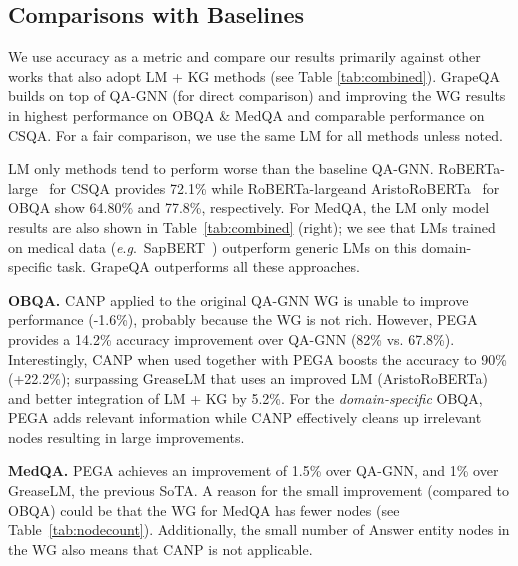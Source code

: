 \documentclass[11pt]{article}
\renewcommand{\paragraph}[1]{\vspace{1mm}\noindent\textbf{#1}}
\newcommand{\eg}{\textit{e}.\textit{g}.}
\newcommand{\roberta}{RoBERTa-large}
\newcommand{\methodname}{GrapeQA}
\begin{document}
\subsection{Comparisons with Baselines}
We use accuracy as a metric and compare our results primarily against other works that also adopt LM + KG methods (see Table \ref{tab:combined}).
\methodname{} builds on top of QA-GNN (for direct comparison) and improving the WG results in highest performance on OBQA \& MedQA and comparable performance on CSQA.
For a fair comparison, we use the same LM for all methods unless noted.

LM only methods tend to perform worse than the baseline QA-GNN.
\roberta~\cite{DBLP:journals/corr/abs-1907-11692} for CSQA provides 72.1\% while \roberta and AristoRoBERTa~\cite{clark2019aristoroberta} for OBQA show 64.80\% and 77.8\%, respectively.
For MedQA, the LM only model results are also shown in Table~\ref{tab:combined} (right); we see that LMs trained on medical data (\eg~SapBERT~\cite{https://doi.org/10.48550/arxiv.2010.11784}) outperform generic LMs on this domain-specific task.
\methodname{} outperforms all these approaches.





\paragraph{OBQA.}
CANP applied to the original QA-GNN WG is unable to improve performance (-1.6\%), probably because the WG is not rich.
However, PEGA provides a 14.2\% accuracy improvement over QA-GNN (82\% vs. 67.8\%).
Interestingly, CANP when used together with PEGA boosts the accuracy to 90\% (+22.2\%);
surpassing GreaseLM that uses an improved LM (AristoRoBERTa) and better integration of LM + KG by 5.2\%.
For the \emph{domain-specific} OBQA, PEGA adds relevant information while CANP effectively cleans up irrelevant nodes resulting in large improvements.




\paragraph{MedQA.}
PEGA achieves an improvement of 1.5\% over QA-GNN, and 1\% over GreaseLM, the previous SoTA.
A reason for the small improvement (compared to OBQA) could be that the WG for MedQA has fewer nodes (see Table~\ref{tab:nodecount}).
Additionally, the small number of Answer entity nodes in the WG also means that CANP is not applicable.
\end{document}
